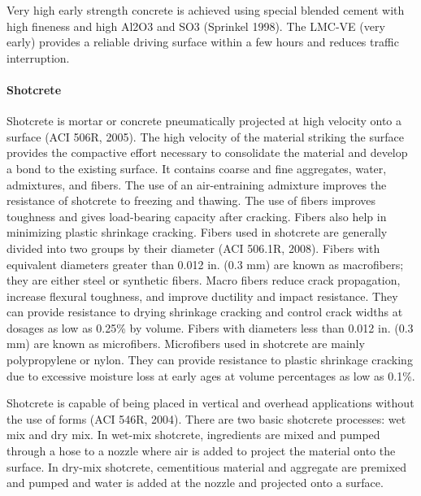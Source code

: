 Very high early strength concrete is achieved using special blended cement with high fineness and high Al2O3
and SO3 (Sprinkel 1998). The LMC-VE (very early) provides a reliable driving surface within a few hours and
reduces traffic interruption.

\paragraph{Shotcrete}
Shotcrete is mortar or concrete pneumatically projected at high velocity onto a surface (ACI 506R, 2005). The
high velocity of the material striking the surface provides the compactive effort necessary to consolidate the material
and develop a bond to the existing surface. It contains coarse and fine aggregates, water, admixtures, and fibers. The
use of an air-entraining admixture improves the resistance of shotcrete to freezing and thawing. The use of fibers
improves toughness and gives load-bearing capacity after cracking. Fibers also help in minimizing plastic shrinkage cracking. Fibers used in shotcrete are generally divided into two groups by their diameter (ACI 506.1R, 2008).
Fibers with equivalent diameters greater than 0.012 in. (0.3 mm) are known as macrofibers; they are either steel or
synthetic fibers. Macro fibers reduce crack propagation, increase flexural toughness, and improve ductility and
impact resistance. They can provide resistance to drying shrinkage cracking and control crack widths at dosages as
low as 0.25\% by volume. Fibers with diameters less than 0.012 in. (0.3 mm) are known as microfibers. Microfibers
used in shotcrete are mainly polypropylene or nylon. They can provide resistance to plastic shrinkage cracking due
to excessive moisture loss at early ages at volume percentages as low as 0.1\%.

Shotcrete is capable of being placed in vertical and overhead applications without the use of forms (ACI 546R,
2004). There are two basic shotcrete processes: wet mix and dry mix. In wet-mix shotcrete, ingredients are mixed
and pumped through a hose to a nozzle where air is added to project the material onto the surface. In dry-mix
shotcrete, cementitious material and aggregate are premixed and pumped and water is added at the nozzle and
projected onto a surface.

